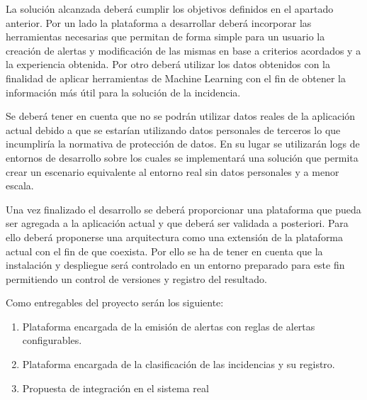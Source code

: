 La solución alcanzada deberá cumplir los objetivos definidos en el apartado anterior. Por un lado la plataforma a desarrollar deberá incorporar las herramientas necesarias que permitan de forma simple para un usuario la creación de alertas y modificación de las mismas en base a criterios acordados y a la experiencia obtenida. Por otro deberá utilizar los datos obtenidos con la finalidad de aplicar herramientas de Machine Learning con el fin de obtener la información más útil para la solución de la incidencia.

Se deberá tener en cuenta que no se podrán utilizar datos reales de la aplicación actual debido a que se estarían utilizando datos personales de terceros lo que incumpliría la normativa de protección de datos. En su lugar se utilizarán logs de entornos de desarrollo sobre los cuales se implementará una solución que permita crear un escenario equivalente al entorno real sin datos personales y a menor escala.

Una vez finalizado el desarrollo se deberá proporcionar una plataforma que pueda ser agregada a la aplicación actual y que deberá ser validada a posteriori. Para ello deberá proponerse una arquitectura como una extensión de la plataforma actual con el fin de que coexista. Por ello se ha de tener en cuenta que la instalación y despliegue será controlado en un entorno preparado para este fin permitiendo un control de versiones y registro del resultado.

Como entregables del proyecto serán los siguiente:
\begin{enumerate}
\item Plataforma encargada de la emisión de alertas con reglas de alertas configurables.
\item Plataforma encargada de la clasificación de las incidencias y su registro.
\item Propuesta de integración en el sistema real
\end{enumerate}